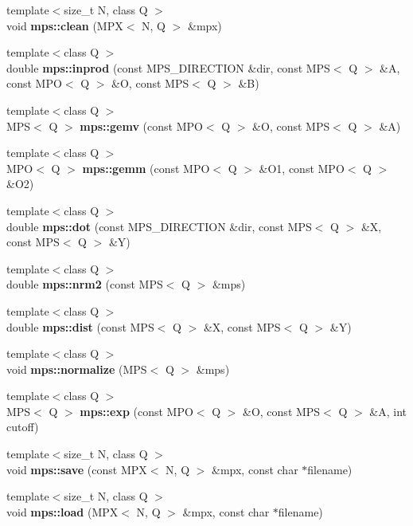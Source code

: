 \begin{DoxyCompactItemize}
{\footnotesize template$<$size\-\_\-t N, class Q $>$ }\\void {\bf mps\-::clean} (M\-P\-X$<$ N, Q $>$ \&mpx)
\item 
{\footnotesize template$<$class Q $>$ }\\double {\bf mps\-::inprod} (const M\-P\-S\-\_\-\-D\-I\-R\-E\-C\-T\-I\-O\-N \&dir, const M\-P\-S$<$ Q $>$ \&A, const M\-P\-O$<$ Q $>$ \&O, const M\-P\-S$<$ Q $>$ \&B)
\item 
{\footnotesize template$<$class Q $>$ }\\M\-P\-S$<$ Q $>$ {\bf mps\-::gemv} (const M\-P\-O$<$ Q $>$ \&O, const M\-P\-S$<$ Q $>$ \&A)
\item 
{\footnotesize template$<$class Q $>$ }\\M\-P\-O$<$ Q $>$ {\bf mps\-::gemm} (const M\-P\-O$<$ Q $>$ \&O1, const M\-P\-O$<$ Q $>$ \&O2)
\item 
{\footnotesize template$<$class Q $>$ }\\double {\bf mps\-::dot} (const M\-P\-S\-\_\-\-D\-I\-R\-E\-C\-T\-I\-O\-N \&dir, const M\-P\-S$<$ Q $>$ \&X, const M\-P\-S$<$ Q $>$ \&Y)
\item 
{\footnotesize template$<$class Q $>$ }\\double {\bf mps\-::nrm2} (const M\-P\-S$<$ Q $>$ \&mps)
\item 
{\footnotesize template$<$class Q $>$ }\\double {\bf mps\-::dist} (const M\-P\-S$<$ Q $>$ \&X, const M\-P\-S$<$ Q $>$ \&Y)
\item 
{\footnotesize template$<$class Q $>$ }\\void {\bf mps\-::normalize} (M\-P\-S$<$ Q $>$ \&mps)
\item 
{\footnotesize template$<$class Q $>$ }\\M\-P\-S$<$ Q $>$ {\bf mps\-::exp} (const M\-P\-O$<$ Q $>$ \&O, const M\-P\-S$<$ Q $>$ \&A, int cutoff)
\item 
{\footnotesize template$<$size\-\_\-t N, class Q $>$ }\\void {\bf mps\-::save} (const M\-P\-X$<$ N, Q $>$ \&mpx, const char $\ast$filename)
\item 
{\footnotesize template$<$size\-\_\-t N, class Q $>$ }\\void {\bf mps\-::load} (M\-P\-X$<$ N, Q $>$ \&mpx, const char $\ast$filename)
\end{DoxyCompactItemize}
